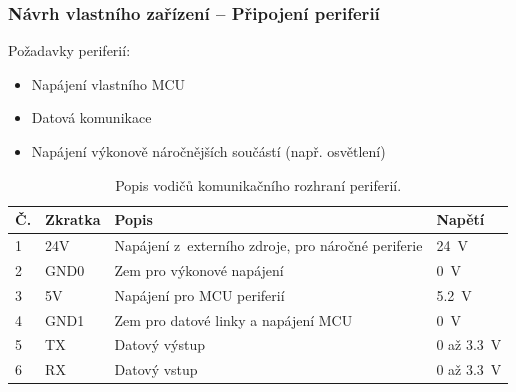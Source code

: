 \documentclass[%
  12pt,       				%
	t,                  %
	aspectratio=1610,   %
	unicode,						%
]{beamer}				    	%
\begin{document}
\begin{frame}[fragile]
\end{frame}


\begin{frame}[fragile]
	\frametitle{Návrh vlastního zařízení -- Připojení periferií}
	
			Požadavky periferií:\\[1ex]
			\begin{itemize}
				\item Napájení vlastního MCU
				\item Datová komunikace 
				\item Napájení výkonově náročnějších součástí (např. osvětlení)
			\end{itemize}
			\vspace{1.5ex}%
			\begin{table}[h!]
				\centering
				\caption{Popis vodičů komunikačního rozhraní periferií.}
				\label{tab:sbernice-popis-vodicu}
				\begin{tabular}{llll}
					\toprule
					\textbf{Č.} & \textbf{Zkratka} & \textbf{Popis} & \textbf{Napětí} \\
					\midrule
					1 & 24V & Napájení z~externího zdroje, pro náročné periferie & \qty{24}{V} \\
					2 & GND0 & Zem pro výkonové napájení & \qty{0}{V}\\
					3 & 5V & Napájení pro MCU periferií & \qty{5.2}{V}\\
					4 & GND1 & Zem pro datové linky a napájení MCU & \qty{0}{V}\\
					5 & TX & Datový výstup & 0 až \qty{3.3}{V}\\
					6 & RX & Datový vstup & 0 až \qty{3.3}{V}\\
					\bottomrule
				\end{tabular}
			\end{table}
\end{frame}
\end{document}
